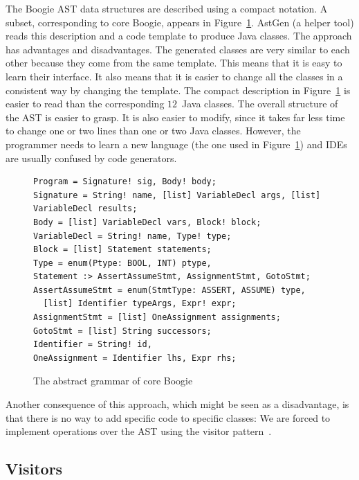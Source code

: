 \documentclass{llncs}
\begin{document}
The Boogie AST data structures are described using a compact
notation. A subset, corresponding to core Boogie, appears in
Figure~\ref{fig:boogie-absgrm}. AstGen (a helper tool) reads this
description and a code template to produce Java classes. The
approach has advantages and disadvantages. The generated classes
are very similar to each other because they come from the same
template. This means that it is easy to learn their interface.
It also means that it is easier to change all the classes in a
consistent way by changing the template. The compact description
in Figure~\ref{fig:boogie-absgrm} is easier to read than the
corresponding $12$~Java classes. The overall structure of the AST
is easier to grasp. It is also easier to modify, since it takes
far less time to change one or two lines than one or two Java
classes. However, the programmer needs to learn a new language
(the one used in Figure~\ref{fig:boogie-absgrm}) and IDEs are
usually confused by code generators.

\begin{figure}\centering\footnotesize %
\begin{verbatim}
Program = Signature! sig, Body! body;
Signature = String! name, [list] VariableDecl args, [list] VariableDecl results;
Body = [list] VariableDecl vars, Block! block;
VariableDecl = String! name, Type! type;
Block = [list] Statement statements; 
Type = enum(Ptype: BOOL, INT) ptype,
Statement :> AssertAssumeStmt, AssignmentStmt, GotoStmt;
AssertAssumeStmt = enum(StmtType: ASSERT, ASSUME) type, 
  [list] Identifier typeArgs, Expr! expr;
AssignmentStmt = [list] OneAssignment assignments;
GotoStmt = [list] String successors;
Identifier = String! id, 
OneAssignment = Identifier lhs, Expr rhs;
\end{verbatim}
\caption{The abstract grammar of core Boogie}\label{fig:boogie-absgrm}
\end{figure} %

Another consequence of this approach, which might be seen as a
disadvantage, is that there is no way to add specific code to
specific classes: We are forced to implement operations over the
AST using the visitor pattern~\cite{gamma1995}.

\subsection{Visitors} %
\label{sec:visitors}

\end{document}
